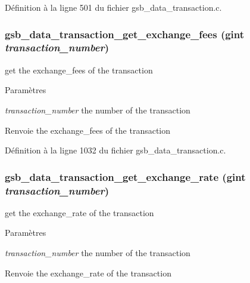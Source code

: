 Définition à la ligne 501 du fichier gsb\_\-data\_\-transaction.c.

\subsubsection[{gsb\_\-data\_\-transaction\_\-get\_\-exchange\_\-fees}]{ gsb\_\-data\_\-transaction\_\-get\_\-exchange\_\-fees (gint {\em transaction\_\-number})}\label{gsb__data__transaction_8h_ae9b1f8064c54242943010ba571769529}
get the exchange\_\-fees of the transaction


\begin{DoxyParams}{Paramètres}
\item[{\em transaction\_\-number}]the number of the transaction\end{DoxyParams}
\begin{DoxyReturn}{Renvoie}
the exchange\_\-fees of the transaction 
\end{DoxyReturn}


Définition à la ligne 1032 du fichier gsb\_\-data\_\-transaction.c.

\subsubsection[{gsb\_\-data\_\-transaction\_\-get\_\-exchange\_\-rate}]{ gsb\_\-data\_\-transaction\_\-get\_\-exchange\_\-rate (gint {\em transaction\_\-number})}\label{gsb__data__transaction_8h_a4a80a52634eeaaaa3b1ad3ad2e83389f}
get the exchange\_\-rate of the transaction


\begin{DoxyParams}{Paramètres}
\item[{\em transaction\_\-number}]the number of the transaction\end{DoxyParams}
\begin{DoxyReturn}{Renvoie}
the exchange\_\-rate of the transaction 
\end{DoxyReturn}


